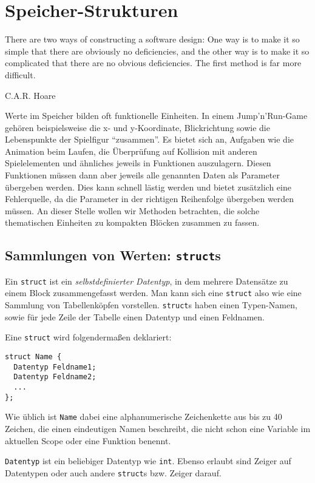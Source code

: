 \chapter{Speicher-Strukturen} \label{chp:structs}
\epigraph{There are two ways of constructing a software design: One way is to make it so simple that there are obviously no deficiencies, and the other way is to make it so complicated that there are no obvious deficiencies. The first method is far more difficult.}
{C.A.R. Hoare}

Werte im Speicher bilden oft funktionelle Einheiten. In einem Jump'n'Run-Game gehören beispielsweise die x- und y-Koordinate, Blickrichtung sowie die Lebenspunkte der Spielfigur \enquote{zusammen}. Es bietet sich an, Aufgaben wie die Animation beim Laufen, die Überprüfung auf Kollision mit anderen Spielelementen und ähnliches jeweils in Funktionen auszulagern. Diesen Funktionen müssen dann aber jeweils alle genannten Daten als Parameter übergeben werden. Dies kann schnell lästig werden und bietet zusätzlich eine Fehlerquelle, da die Parameter in der richtigen Reihenfolge übergeben werden müssen. An dieser Stelle wollen wir Methoden betrachten, die solche thematischen Einheiten zu kompakten Blöcken zusammen zu fassen.

\section{Sammlungen von Werten: \texttt{struct}s}
Ein \texttt{struct} ist ein \emph{selbstdefinierter Datentyp}, in dem mehrere Datensätze zu einem Block zusammengefasst werden. Man kann sich eine \texttt{struct} also wie eine Sammlung von Tabellenköpfen vorstellen. \texttt{struct}s haben einen Typen-Namen, sowie für jede Zeile der Tabelle einen Datentyp und einen Feldnamen.

Eine \texttt{struct} wird folgendermaßen deklariert:
\begin{codebox}
\begin{verbatim}
struct Name {
  Datentyp Feldname1;
  Datentyp Feldname2;
  ...
};
\end{verbatim}
\end{codebox}

Wie üblich ist \texttt{Name} dabei eine alphanumerische Zeichenkette aus bis zu 40 Zeichen, die einen eindeutigen Namen beschreibt, \ie die nicht schon eine Variable im aktuellen Scope oder eine Funktion benennt.

\texttt{Datentyp} ist ein beliebiger Datentyp wie \eg \texttt{int}. Ebenso erlaubt sind Zeiger auf Datentypen oder auch andere \texttt{struct}s bzw. Zeiger darauf.

